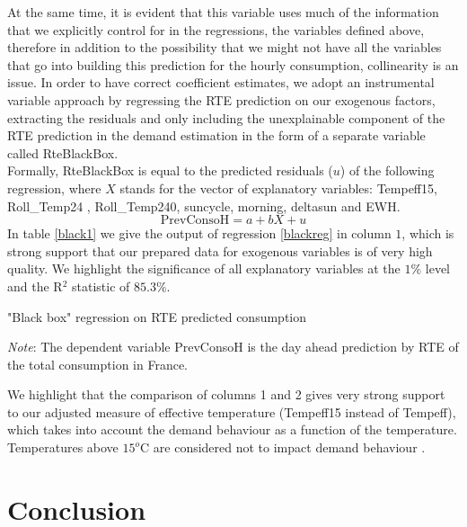 At the same time, it is evident that this variable uses much of the information that we explicitly control for in the regressions, the variables defined above, therefore in addition to the possibility that we might not have all the variables that go into building this prediction for the hourly consumption, collinearity is an issue. In order to have correct coefficient estimates, we adopt an instrumental variable approach by regressing the RTE prediction on our exogenous factors, extracting the residuals and only including the unexplainable component of the RTE prediction in the demand estimation in the form of a separate variable called RteBlackBox.\\

Formally, RteBlackBox is equal to the predicted residuals ($u$) of the following regression, where $X$ stands for the vector of explanatory variables: Tempeff15,  Roll\_Temp24 ,  Roll\_Temp240, suncycle, morning, deltasun and EWH.  \\
\begin{equation}
\label{blackreg}
 \text{PrevConsoH} = a + bX +u 
\end{equation}
In table \ref{black1} we give the output of regression \ref{blackreg} in column $1$, which is strong support that our prepared data for exogenous variables is of very high quality. We highlight the significance of all explanatory variables at the $1\%$ level and the R$^2$ statistic of $85.3\%$. \\

\begin{table}[!ht]

\caption{\label{black1} "Black box" regression on RTE predicted consumption}
\emph{Note}: The dependent variable PrevConsoH is the day ahead prediction by RTE of the total consumption in France. 
\end{table}

We highlight that the comparison of columns 1 and 2 gives very strong support to our adjusted measure of effective temperature (Tempeff15 instead of Tempeff), which takes into account the demand behaviour as a function of the temperature. Temperatures above $15^o$C are considered not to impact demand behaviour \cite{rtewebsite1}.

\section{Conclusion}

